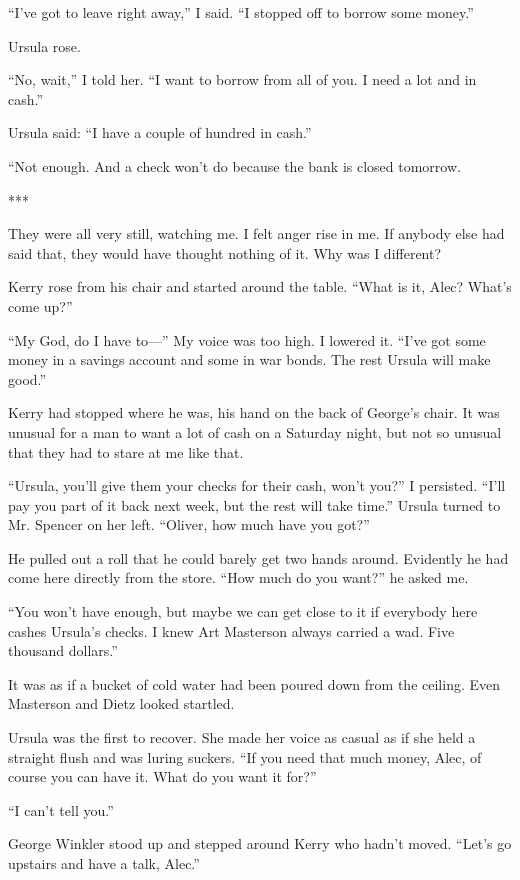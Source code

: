 \documentclass{novel}
\begin{document}
{“I’ve got to leave right away,” I said. “I stopped off to borrow some money.”

Ursula rose.

“No, wait,” I told her. “I want to borrow from all of you. I need a lot and in cash.”

Ursula said: “I have a couple of hundred in cash.”

“Not enough. And a check won’t do because the bank is closed tomorrow.

***

They were all very still, watching me. I felt anger rise in me. If anybody else had said that, they would have thought nothing of it. Why was I different?

Kerry rose from his chair and started around the table. “What is it, Alec? What’s come up?”

“My God, do I have to—” My voice was too high. I lowered it. “I’ve got some money in a savings account and some in war bonds. The rest Ursula will make good.”

Kerry had stopped where he was, his hand on the back of George’s chair. It was unusual for a man to want a lot of cash on a Saturday night, but not so unusual that they had to stare at me like that.

“Ursula, you’ll give them your checks for their cash, won’t you?” I persisted. “I’ll pay you part of it back next week, but the rest will take time.” Ursula turned to Mr. Spencer on her left. “Oliver, how much have you got?”

He pulled out a roll that he could barely get two hands around. Evidently he had come here directly from the store. “How much do you want?” he asked me.

“You won’t have enough, but maybe we can get close to it if everybody here cashes Ursula’s checks. I knew Art Masterson always carried a wad. Five thousand dollars.”

It was as if a bucket of cold water had been poured down from the ceiling. Even Masterson and Dietz looked startled.

Ursula was the first to recover. She made her voice as casual as if she held a straight flush and was luring suckers. “If you need that much money, Alec, of course you can have it. What do you want it for?”

“I can’t tell you.”

George Winkler stood up and stepped around Kerry who hadn’t moved. “Let’s go upstairs and have a talk, Alec.”

}
\end{document}
